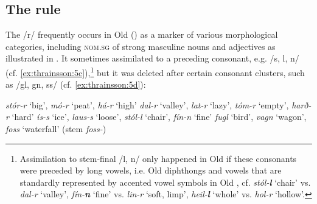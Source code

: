 \documentclass[output=paper,
modfonts
]{LSP/langsci}
\begin{document}
\subsection{The  rule}\label{the-epenthesis-rule}

The  /r/ frequently occurs in Old  () as a
marker of various morphological categories, including \textsc{nom.sg} of
strong masculine nouns and adjectives as illustrated in . It
sometimes assimilated to a preceding consonant, e.g. /s, l, n/ (cf.
\ref{ex:thrainsson:5c}),\footnote{Assimilation to stem-final /l, n/ only happened in Old
   if these consonants were preceded by long vowels, i.e. Old
   diphthongs and vowels that are standardly represented by
  accented vowel symbols in Old  , cf.
  \emph{stól-\textbf{l}} `chair' vs. \emph{dal-r} `valley',
  \emph{fín-\textbf{n}} `fine' vs. \emph{lin-r} `soft, limp',
  \emph{heil-\textbf{l}} `whole' vs. \emph{hol-r} `hollow'.} but it was
deleted after certain consonant clusters, such as /gl, gn, ss/ (cf.
\ref{ex:thrainsson:5d}):

\ea \label{ex:thrainsson:5}
	\ea \label{ex:thrainsson:5a} \emph{stór-r} `big', \emph{mó-r} `peat', \emph{há-r} `high'
	\ex \label{ex:thrainsson:5b} \emph{dal-r} `valley', \emph{lat-r} `lazy', \emph{tóm-r} `empty', \emph{harð-r} `hard'
	\ex \label{ex:thrainsson:5c} \emph{ís-s} `ice', \emph{laus-s} `loose', \emph{stól-l} `chair', \emph{fín-n} `fine'
	\ex \label{ex:thrainsson:5d} \emph{fugl} `bird', \emph{vagn} `wagon', \emph{foss} `waterfall' (stem \emph{foss-})
	\z
\z
\end{document}
